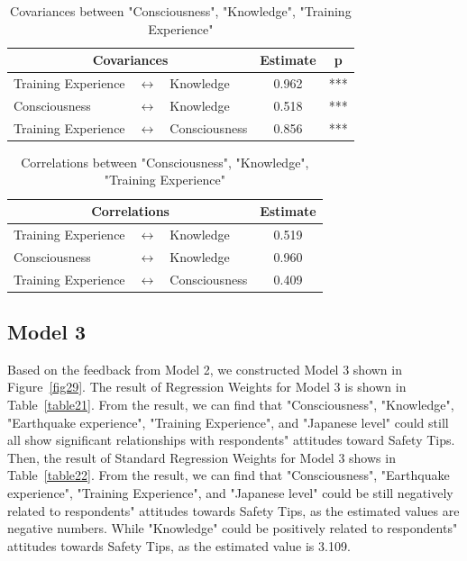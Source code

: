 \begin{table}[h]
  \caption{Covariances between "Consciousness", "Knowledge", "Training Experience"}
  \label{table13}
  \centering
  \begin{tabular}{|l|c|l|c|c|}
  \hline
   \multicolumn{3}{|c|}{Covariances} & Estimate & p \\
  \hline
  Training Experience & $\longleftrightarrow$ & Knowledge & 0.962 & *** \\
  Consciousness & $\longleftrightarrow$ & Knowledge & 0.518 & *** \\
  Training Experience & $\longleftrightarrow$ & Consciousness & 0.856 & *** \\
  \hline
  \end{tabular}
\end{table}

\begin{table}[h]
  \caption{Correlations between "Consciousness", "Knowledge", "Training Experience" }
  \label{table14}
  \centering  \begin{tabular}{|l|c|l|c|}
  \hline
   \multicolumn{3}{|c|}{Correlations} & Estimate \\
  \hline
  Training Experience & $\longleftrightarrow$ & Knowledge & 0.519 \\
  Consciousness & $\longleftrightarrow$ & Knowledge & 0.960 \\
  Training Experience & $\longleftrightarrow$ & Consciousness & 0.409 \\
  \hline
  \end{tabular}
\end{table}
\fi

\subsection{Model 3}
Based on the feedback from Model 2, we constructed Model 3 shown in Figure~\ref{fig29}. The result of Regression Weights for Model 3 is shown in Table~\ref{table21}. From the result, we can find that "Consciousness", "Knowledge", "Earthquake experience", "Training Experience", and "Japanese level" could still all show significant relationships with respondents" attitudes toward Safety Tips. Then, the result of Standard Regression Weights for Model 3 shows in Table~\ref{table22}. From the result, we can find that "Consciousness", "Earthquake experience", "Training Experience", and "Japanese level" could be still negatively related to respondents" attitudes towards Safety Tips, as the estimated values are negative numbers. While "Knowledge" could be positively related to respondents" attitudes towards Safety Tips, as the estimated value is 3.109. 

